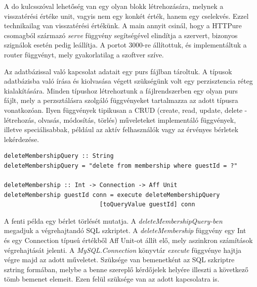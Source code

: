 \documentclass[12pt]{article}
\begin{document}
A do kulcsszóval lehetőség van egy olyan blokk létrehozására, melynek a visszatérési értéke unit, vagyis nem egy konkét érték, hanem egy cselekvés. Ezzel technikailag van visszatérési értékünk.  A main annyit csinál, hogy a HTTPure csomagból származó  \textit{serve} függvény segítségével elindítja a szervert, bizonyos szignálok esetén pedig leállítja. A portot 3000-re állítottuk, és implementáltuk a router függvényt, mely gyakorlatilag a szoftver szíve.

Az adatbázissal való kapcsolat adatait egy purs fájlban tároltuk. A típusok adatbázisba való írása és kiolvasása végett szükségünk volt egy perzisztencia réteg kialakítására. Minden típushoz létrehoztunk a fájlrendszerben egy olyan purs fájlt, mely a perzsztálásra szolgáló függvényeket tartalmazza az adott típusra vonatkozóan. Ilyen függvények tipikusan a CRUD (create, read, update, delete - létrehozás, olvasás, módosítás, törlés) műveleteket implementáló függvények, illetve speciálisabbak, például az aktív felhasználók vagy az érvényes bérletek lekérdezése.

\begin{verbatim}
deleteMembershipQuery :: String
deleteMembershipQuery = "delete from membership where guestId = ?"

deleteMembership :: Int -> Connection -> Aff Unit
deleteMembership guestId conn = execute deleteMembershipQuery
                           [toQueryValue guestId] conn
\end{verbatim}
A fenti példa egy bérlet törlését mutatja.  A \textit{deleteMembershipQuery-ben} megadjuk a végrehajtandó SQL szkriptet. 
 A \textit{deleteMembership} függvény egy Int és egy Connection típusú értékből Aff Unit-ot állít elő, mely aszinkron számítások végrehajtását jelenti.  A \textit{MySQL.Connection} könyvtár \textit{execute} függvénye hajtja végre majd az adott műveletet. Szüksége van bemenetként az SQL szkriptre sztring formában, melybe a benne szereplő kérdőjelek helyére illeszti a következő tömb bemenet elemeit. Ezen felül szüksége van az adott kapcsolatra is.
\end{document}
